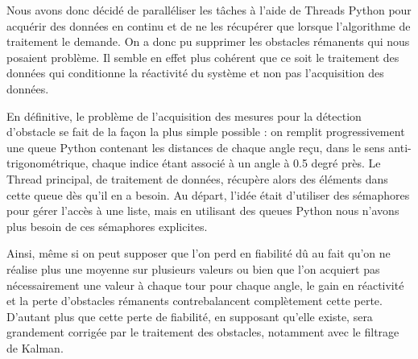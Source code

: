 \tab Nous avons donc décidé de paralléliser les tâches à l’aide de Threads Python pour acquérir des données en continu et de ne les récupérer que lorsque l’algorithme de traitement le demande. On a donc pu supprimer les obstacles rémanents qui nous posaient problème. Il semble en effet plus cohérent que ce soit le traitement des données qui conditionne la réactivité du système et non pas l'acquisition des données. 

\tab En définitive, le problème de l'acquisition des mesures pour la détection d'obstacle se fait de la façon la plus simple possible : on remplit progressivement une queue Python contenant les distances de chaque angle reçu, dans le sens anti-trigonométrique, chaque indice étant associé à un angle à 0.5 degré près. Le Thread principal, de traitement de données, récupère alors des éléments dans cette queue dès qu'il en a besoin. Au départ, l'idée était d'utiliser des sémaphores pour gérer l'accès à une liste, mais en utilisant des queues Python nous n'avons plus besoin de ces sémaphores explicites.



\tab Ainsi, même si on peut supposer que l'on perd en fiabilité dû au fait qu'on ne réalise plus une moyenne sur plusieurs valeurs ou bien que l'on acquiert pas nécessairement une valeur à chaque tour pour chaque angle, le gain en réactivité et la perte d'obstacles rémanents contrebalancent complètement cette perte. D'autant plus que cette perte de fiabilité, en supposant qu'elle existe, sera grandement corrigée par le traitement des obstacles, notamment avec le filtrage de Kalman.


